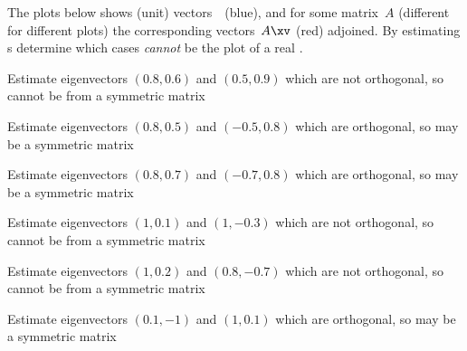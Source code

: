\begin{example} 
The plots below shows (unit) vectors~\xv\ (blue), and for some matrix~\(A\) (different for different plots) the corresponding vectors~\(A\xv\) (red) adjoined. 
By estimating s determine which cases \emph{cannot} be the plot of a real .
\begin{Parts}
\begin{reduce}
\item {}
\begin{solution} 
Estimate eigenvectors \((0.8,0.6)\) and \((0.5,0.9)\) which are not orthogonal, so cannot be from a symmetric matrix 
\end{solution}
\end{reduce}

\item {}
\begin{solution} 
Estimate eigenvectors \((0.8,0.5)\) and \((-0.5,0.8)\) which are  orthogonal, so may be a symmetric matrix 
\end{solution}

\begin{reduce}
\item {}
\begin{solution} 
Estimate eigenvectors \((0.8,0.7)\) and \((-0.7,0.8)\) which are orthogonal, so may be a symmetric matrix 
\end{solution}
\end{reduce}

\item {}
\begin{solution} 
Estimate eigenvectors \((1,0.1)\) and \((1,-0.3)\) which are not orthogonal, so cannot be from a symmetric matrix 
\end{solution}

\begin{reduce}
\item {}
\begin{solution} 
Estimate eigenvectors \((1,0.2)\) and \((0.8,-0.7)\) which are not orthogonal, so cannot be from a symmetric matrix 
\end{solution}

\item {}
\begin{solution} 
Estimate eigenvectors \((0.1,-1)\) and \((1,0.1)\) which are orthogonal, so may be a symmetric matrix 
\end{solution}
\end{reduce}

\end{Parts}
\end{example}



